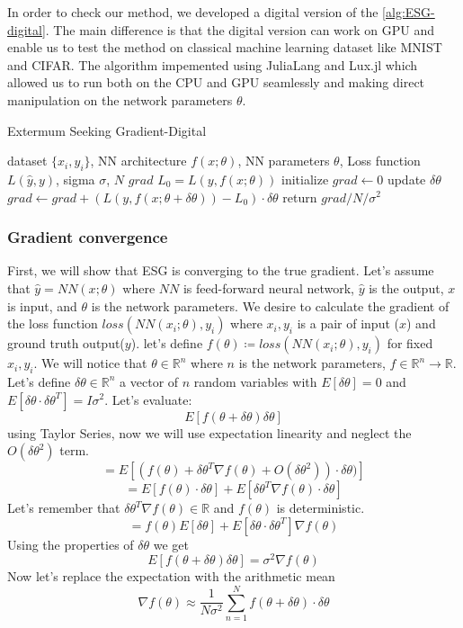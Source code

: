 \documentclass[nohyperref]{article}
\theoremstyle{plain}
\theoremstyle{definition}
\theoremstyle{remark}
\begin{document}
In order to check our method, we developed a digital version of the \cref{alg:ESG-digital}. The main difference is that the digital version can work on GPU and enable us to test the method on classical machine learning dataset like MNIST and CIFAR.
The algorithm impemented using JuliaLang\cite{Julia-2017} and Lux.jl\cite{pal2023lux} which allowed us to run both on the CPU and GPU seamlessly and making direct manipulation on the network parameters $\theta$.
\begin{algorithm}[tb]
   \caption{Extermum Seeking Gradient-Digital}
   \label{alg:ESG-digital}
\begin{algorithmic}
   dataset $\{x_{i},y_{i}\}$, NN architecture $f(x;\theta)$, NN parameters $\theta$, Loss function $L(\hat{y},y)$, sigma $\sigma$, $N$
   $grad$  
   \STATE $L_{0} = L(y,f(x;\theta))$
   \STATE initialize $grad \leftarrow 0$
   \STATE update $\delta\theta$
   \STATE $grad \leftarrow grad + (L(y,f(x;\theta+\delta \theta))-L_{0})\cdot\delta \theta$
   \ENDFOR
   \STATE return $grad/N/\sigma^{2}$
\end{algorithmic}
\end{algorithm}


\subsubsection{Gradient convergence}
First, we will show that ESG is converging to the true gradient.
Let's assume that $\hat{y} = NN(x;\theta)$ where $NN$ is feed-forward neural network, $\hat{y}$ is the output, $x$ is input, and $\theta$ is the network parameters.
We desire to calculate the gradient of the loss function $loss(NN(x_{i};\theta),y_{i})$ where ${x_{i},y_{i}}$ is a pair of input ($x$) and ground truth output($y$).
let's define $f(\theta) \coloneqq loss(NN(x_{i};\theta),y_{i})$ for fixed ${x_{i},y_{i}}$.
We will notice that $\theta \in \mathbb{R}^{n} $ where $n$ is the network parameters, $f \in \mathbb{R}^{n}\rightarrow\mathbb{R}$.
Let's define $\delta\theta \in \mathbb{R}^{n}$ a vector of $n$ random variables with $E[\delta\theta]=0$ and $E[\delta\theta \cdot \delta\theta^{T}]=I\sigma^{2}$.
Let's evaluate:
$$E[f(\theta+\delta\theta)\delta\theta]$$
using Taylor Series, now we will use expectation linearity and neglect the $O(\delta\theta^{2})$ term.
$$=E[(f(\theta)+\delta\theta^{T} \nabla f(\theta)+O(\delta\theta^{2}))\cdot \delta\theta)]$$
$$=E[f(\theta)\cdot \delta\theta]+E[\delta\theta^{T} \nabla f(\theta)\cdot \delta\theta]$$
Let's remember that $\delta\theta^{T} \nabla f(\theta) \in \mathbb{R}$ and $f(\theta)$ is deterministic.
$$=f(\theta)E[\delta\theta]+E[\delta\theta \cdot \delta\theta^{T}] \nabla f(\theta)$$
Using the properties of $\delta\theta$ we get
$$E[f(\theta+\delta\theta)\delta\theta]= \sigma^{2}\nabla f(\theta)$$
Now let's replace the expectation with the arithmetic mean
$$\nabla f(\theta) \approx \frac{1}{N\sigma^{2}}\sum^{N}_{n=1} f(\theta+\delta\theta)\cdot \delta\theta$$
\end{document}
